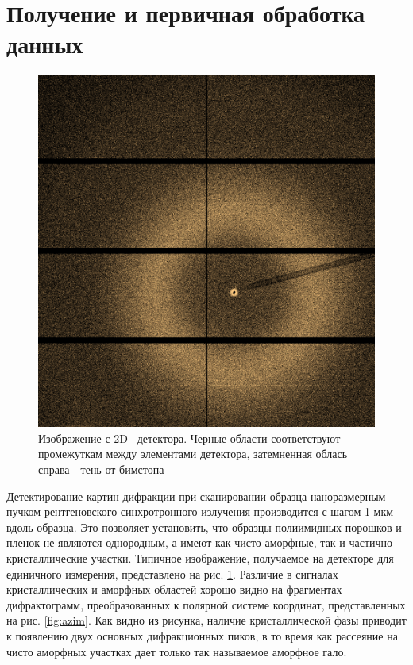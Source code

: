 	\section{Получение и первичная обработка данных}
	
	
			\begin{figure}
\singlespacing
\vspace{-35px}
    \includegraphics[width=0.9\linewidth]{fig/obj.png}
    \vspace{3px}
    \caption{Изображение с 2D~-детектора. Черные области соответствуют промежуткам между элементами детектора, затемненная облась справа  - тень от бимстопа}
    \label{fig:difractogram}
\end{figure}
	
	
	Детектирование картин дифракции при сканировании образца наноразмерным пучком рентгеновского синхротронного излучения производится с шагом 1 мкм вдоль образца. 
	Это позволяет установить, что образцы полиимидных порошков и пленок не являются однородным, а имеют как чисто аморфные, так и частично-кристаллические участки.
	Типичное изображение, получаемое на детекторе для единичного измерения, представлено на рис. \ref{fig:difractogram}. Различие в сигналах кристаллических и аморфных областей хорошо видно на фрагментах дифрактограмм, преобразованных к полярной системе координат, представленных на рис. \ref{fig:azim}. Как видно из рисунка, наличие кристаллической фазы приводит к появлению двух основных дифракционных пиков, в то время как рассеяние на чисто аморфных участках дает только так называемое аморфное гало.
	

